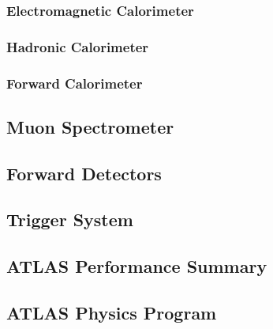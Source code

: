 \subsubsection*{Electromagnetic Calorimeter}


\subsubsection*{Hadronic Calorimeter}


\subsubsection*{Forward Calorimeter}


\subsection{Muon Spectrometer}


\subsection{Forward Detectors}

\subsection{Trigger System}
\label{sec:cern:trigger}

\subsection{ATLAS Performance Summary}


\subsection{ATLAS Physics Program}